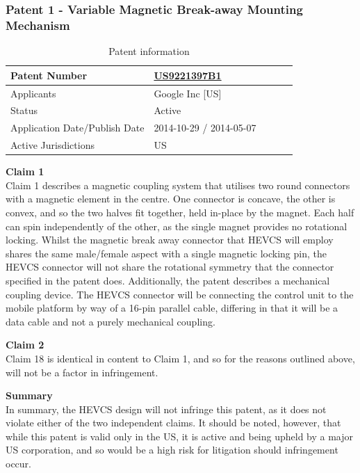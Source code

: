 \documentclass [12pt]{article}
\begin{document}
\subsubsection{Patent 1 - Variable Magnetic Break-away Mounting Mechanism}
\begin{table}[H]
    \centering
    \setlength{\arrayrulewidth}{1.5pt}
    \begin{tabular}{|p{0.5\linewidth}|p{0.5\linewidth}|}
    \hline
    Patent Number & \href{https://worldwide.espacenet.com/patent/search/family/054932262/publication/US9221397B1?q=US9221397B1}{US9221397B1}\\
    \hline
    Applicants & Google Inc [US]\\
    \hline
    Status & Active\\
    \hline
    Application Date/Publish Date & 2014-10-29 / 2014-05-07\\
    \hline
    Active Jurisdictions & US\\
    \hline
    \end{tabular}
    \caption{Patent information}
    \label{table:mag_con1}
\end{table}
\textbf{Claim 1}\\
Claim 1 describes a magnetic coupling system that utilises two round connectors with a magnetic element in the centre. One connector is concave, the other is convex, and so the two halves fit together, held in-place by the magnet. Each half can spin independently of the other, as the single magnet provides no rotational locking.
Whilst the magnetic break away connector that HEVCS will employ shares the same male/female aspect with a single magnetic locking pin, the HEVCS connector will not share the rotational symmetry that the connector specified in the patent does. Additionally, the patent describes a mechanical coupling device. The HEVCS connector will be connecting the control unit to the mobile platform by way of a 16-pin parallel cable, differing in that it will be a data cable and not a purely mechanical coupling.

\textbf{Claim 2}\\
Claim 18 is identical in content to Claim 1, and so for the reasons outlined above, will not be a factor in infringement.

\textbf{Summary}\\
In summary, the HEVCS design will not infringe this patent, as it does not violate either of the two independent claims. It should be noted, however, that while this patent is valid only in the US, it is active and being upheld by a major US corporation, and so would be a high risk for litigation should infringement occur.
\end{document}
